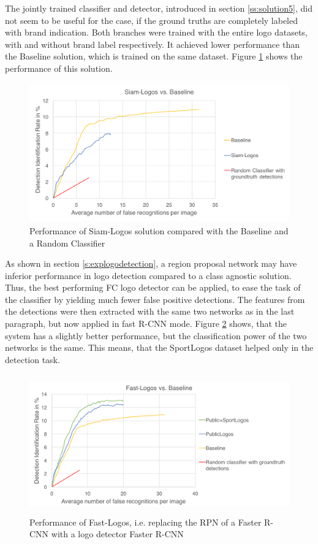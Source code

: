 The jointly trained classifier and detector, introduced in section \ref{ss:solution5}, did not seem to be useful for the case, if the ground truths are completely labeled with brand indication. Both branches were trained with the entire logo datasets, with and without brand label respectively. It achieved lower performance than the Baseline solution, which is trained on the same dataset. Figure \ref{f:sol5} shows the performance of this solution.
\begin{figure}
  \centering
  \includegraphics[height=60mm]{images/mt/sol5.png}
  \caption{Performance of Siam-Logos solution compared with the Baseline and a Random Classifier}
  \label{f:sol5}
\end{figure}
 As shown in section \ref{s:explogodetection}, a region proposal network may have inferior performance in logo detection compared to a class agnostic solution. Thus, the best performing FC logo detector can be applied, to ease the task of the classifier by yielding much fewer false positive detections. The features from the detections were then extracted with the same two networks as in the last paragraph, but now applied in fast R-CNN mode. Figure \ref{f:sol3} shows, that the system has a slightly better performance, but the classification power of the two networks is the same. This means, that the SportLogos dataset helped only in the detection task.
 \begin{figure}
  \centering
  \includegraphics[height=60mm]{images/mt/sol3.png}
  \caption{Performance of Fast-Logos, i.e. replacing the RPN of a Faster R-CNN with a logo detector Faster R-CNN}
  \label{f:sol3}
\end{figure}

